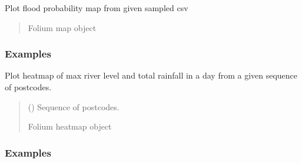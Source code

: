 \documentclass[letterpaper,10pt,english]{sphinxmanual}
\begin{document}
\begin{fulllineitems}
\label{\detokenize{index:flood_tool.plot_flood_prob_sampled}}
\pysigstartsignatures
{}
\pysigstopsignatures
\sphinxAtStartPar
Plot flood probability map from given sampled csv
\begin{quote}\begin{description}
\sphinxAtStartPar
Folium map object

\end{description}\end{quote}
\subsubsection*{Examples}

\begin{sphinxVerbatim}[commandchars=\\\{\}]
  
\end{sphinxVerbatim}

\end{fulllineitems}


\begin{fulllineitems}
\label{\detokenize{index:flood_tool.plot_heatmap}}
\pysigstartsignatures
{}
\pysigstopsignatures
\sphinxAtStartPar
Plot heatmap of max river level and total rainfall in a day
from a given sequence of postcodes.
\begin{quote}\begin{description}
\sphinxAtStartPar
{} () \textendash{} Sequence of postcodes.

\sphinxAtStartPar
Folium heatmap object

\end{description}\end{quote}
\subsubsection*{Examples}

\begin{sphinxVerbatim}[commandchars=\\\{\}]
\PYG{p}{[} \PYG{p}{]}
\end{sphinxVerbatim}

\end{fulllineitems}
\end{document}
